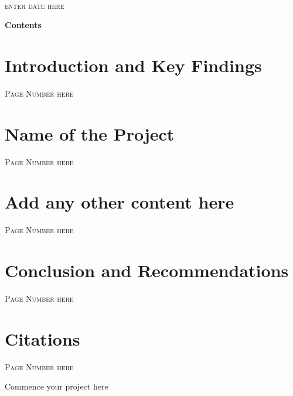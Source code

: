 \documentclass[12pt]{article}
\begin{document}
\begin{titlepage}
\begin{minipage}{0.4\textwidth}
\end{minipage}\\[2cm]



\large \textsc{enter date here}\\[2cm] %

\vfill %

\end{titlepage}

\pagebreak


 \center
\textbf{\LARGE Contents}
\section{\textbf{\large Introduction and Key Findings}}

\textsc{Page Number here}
\vspace{1cm}
\section{\textbf{\large Name of the Project}}  %

\textsc{Page Number here}
\vspace{1cm}
\section{\textbf{\large Add any other content here}}  %

\textsc{Page Number here}
\vspace{1cm}
\section{\textbf{\large Conclusion and Recommendations}}  %

\textsc{Page Number here}
\vspace{1cm}
\section{\textbf{\large Citations}}  %
\textsc{Page Number here}




\pagebreak


Commence your project here %
\end{document}
